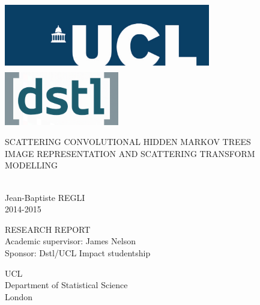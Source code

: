 \documentclass[a4paper,11pt]{report}
\begin{document}
	\begin{titlepage}
		\hspace{-1.5cm}\includegraphics[width=9cm,height= 3cm]{ucl.jpg}
		\hfill{
		  \raggedleft \includegraphics[width=5cm]{dstl.png}
		}
		\vspace*{5cm}
	
		\begin{center}
			\begin{sc} 	
				\huge SCATTERING CONVOLUTIONAL HIDDEN MARKOV TREES
				\vspace*{0.2cm}
				\\ \large IMAGE REPRESENTATION AND SCATTERING TRANSFORM MODELLING
				\vspace*{2cm}
			\end{sc}
			\\ \LARGE Jean-Baptiste REGLI
			\vspace*{0.2cm}
			\\ \large 2014-2015
		\end{center}

		\vfill
		\begin{center}
			\vspace*{1cm}
			\Large RESEARCH REPORT
			\vspace*{0.5cm}
			\\ \large Academic supervisor: James Nelson 
			\\ \large Sponsor: Dstl/UCL Impact studentship
			
			\vspace*{1cm}
			\Large UCL
			\\ \normalsize Department of Statistical Science
			\\ London
		\end{center}
	\end{titlepage}
	\clearpage
\end{document}
